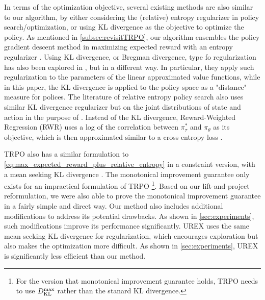 In terms of the optimization objective, several existing methods are also similar to our algorithm,
by either considering the (relative) entropy regularizer in policy search/optimization, or using KL divergence as the objective to optimize the policy. 
As mentioned in \cref{subsec:revisitTRPO}, our algorithm ensembles
the policy gradient descent method in maximizing expected reward with an entropy regularizer \citep{williams1991function,fox2015taming,nachum2017bridging}.
Using KL divergence, or Bregman divergence, type fo regularization has also been explored  in \citet{liu2015finite,thomas2013projected,mahadevan2012sparse}, but in a different way. 
In particular, they apply such regularization to the parameters of the  linear approximated value functions, while in this paper, the KL divergence is applied to the policy space as a "distance" measure for polices. 
The literature of relative entropy policy search also uses similar KL divergence regularizer \citep{peters2010relative,van2015learning} but on the joint distributions of state and action in the purpose of . 
Instead of the KL divergence, Reward-Weighted Regression (RWR) uses a log of the correlation between $\pi^*_\tau$ and $\pi_\theta$ as its objective, which is then approximated similar to a cross entropy loss \citep{peters2007reinforcement,wierstra2008episodic}.

TRPO also has a similar formulation to \cref{eq:max_expected_reward_plus_relative_entropy} in a constraint version, with a mean seeking KL divergence \citep{schulman2015trust}. 
The monotonical improvement guarantee
only exists for an impractical formulation of TRPO \footnote{For the version that monotonical improvement guarantee holds, TRPO needs to use $D_{\mathrm{KL}}^{\max} $ rather than the stanard KL divergence.}. 
Based on our lift-and-project reformulation, we were also able to prove the monotonical improvement guarantee in a fairly simple and direct way.
Our method also includes additional modifications to address its potential drawbacks. As shown in \ref{sec:experiments}, such modifications improve its performance significantly.
UREX uses the same mean seeking KL divergence for regularization, which encourages exploration but also makes the optimization more difficult. As shown in \ref{sec:experiments}, UREX is significantly less efficient than our method. 


